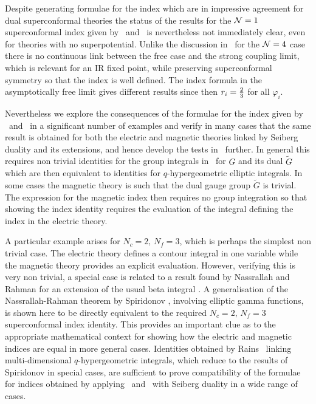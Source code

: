 Despite generating formulae for the index which are in impressive agreement
for dual superconformal theories the status of the results for the ${\cal N}=1$ 
superconformal index given by \ione\ and \itwo\  is nevertheless not immediately 
clear, even for theories with no superpotential. Unlike the discussion in \mald\ 
for the ${\cal N}=4$ case there is no continuous link between the free case and the 
strong coupling limit, which is relevant for an IR fixed point, while preserving 
superconformal symmetry so that the index is well defined. The index formula in 
the asymptotically free limit gives different results since then 
$r_i = {2\over 3}$ for all $\varphi_i$.

Nevertheless we explore the consequences of the formulae for the index given by \ione\ 
and \itwo\ in a significant number of examples and verify in many cases
that the same result is obtained for both the electric and magnetic
theories linked by Seiberg duality and its extensions, and hence develop the tests in  
\romel\ further. In general this requires non trivial identities for the 
group integrals in \itwo\ for $G$ and its dual $\tilde G$ which are then equivalent to
identities for $q$-hypergeometric elliptic integrals. In some cases the magnetic
theory is such that the dual gauge group $\tilde G$ is trivial. The expression for the 
magnetic index then requires no group integration so that showing the index identity 
requires the evaluation of the integral defining the index in the electric theory. 

A particular example arises for $N_c=2, \, N_f=3$, which is perhaps the simplest
non trivial case. The electric theory defines a contour integral in one variable
while the magnetic theory provides an explicit evaluation. However, verifying this
is very non trivial, a special case is related to a result 
found by Nassrallah and Rahman for an extension of the usual beta integral \Nas. 
A generalisation of the Nassrallah-Rahman theorem by Spiridonov \spi,
involving elliptic gamma functions, is shown here to be directly
equivalent to the required $N_c=2, \, N_f=3$ superconformal index identity.
This provides an important clue as to the appropriate mathematical context
for showing how the electric and magnetic indices are equal in more general cases.
Identities obtained by Rains \rains\ linking multi-dimensional $q$-hypergeometric 
integrals, which reduce to the results of Spiridonov in special cases,  are sufficient 
to prove compatibility of the formulae for indices obtained by applying \ione\ and
\itwo\ with Seiberg duality in a wide range of cases.

